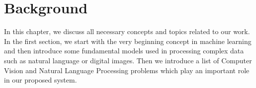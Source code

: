 \chapter{Background}
\label{chap-background}
\begin{ChapAbstract}
In this chapter, we discuss all necessary concepts and topics related to our work. 
In the first section, we start with the very beginning concept in machine learning and then introduce some fundamental models used in processing complex data such as natural language or digital images. 
Then we introduce a list of Computer Vision and Natural Language Processing problems which play an important role in our proposed system. 
\end{ChapAbstract}









